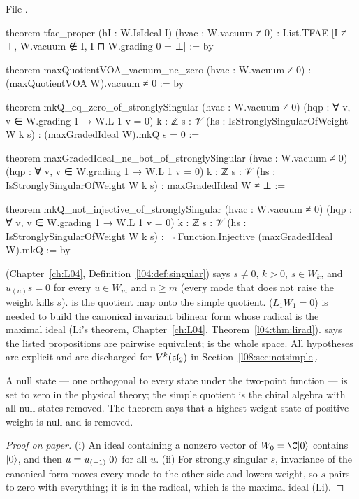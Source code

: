 \noindent File .
\begin{leancode}
theorem tfae_proper (hI : W.IsIdeal I) (hvac : W.vacuum ≠ 0) :
    List.TFAE [I ≠ ⊤, W.vacuum ∉ I, I ⊓ W.grading 0 = ⊥] := by

theorem maxQuotientVOA_vacuum_ne_zero (hvac : W.vacuum ≠ 0) :
    (maxQuotientVOA W).vacuum ≠ 0 := by

theorem mkQ_eq_zero_of_stronglySingular (hvac : W.vacuum ≠ 0)
    (hqp : ∀ v, v ∈ W.grading 1 → W.L 1 v = 0) {k : ℤ} {s : 𝒱}
    (hs : IsStronglySingularOfWeight W k s) : (maxGradedIdeal W).mkQ s = 0 :=

theorem maxGradedIdeal_ne_bot_of_stronglySingular (hvac : W.vacuum ≠ 0)
    (hqp : ∀ v, v ∈ W.grading 1 → W.L 1 v = 0) {k : ℤ} {s : 𝒱}
    (hs : IsStronglySingularOfWeight W k s) : maxGradedIdeal W ≠ ⊥ :=

theorem mkQ_not_injective_of_stronglySingular (hvac : W.vacuum ≠ 0)
    (hqp : ∀ v, v ∈ W.grading 1 → W.L 1 v = 0) {k : ℤ} {s : 𝒱}
    (hs : IsStronglySingularOfWeight W k s) :
    ¬ Function.Injective (maxGradedIdeal W).mkQ := by
\end{leancode}

\begin{dictionary}
 (Chapter~\ref{ch:L04}, Definition~\ref{l04:def:singular}) says
$s\ne0$, $k>0$, $s\in W_k$, and $u_{(n)}s = 0$ for every $u\in W_m$ and $n\ge m$ (every mode that does
not raise the weight kills $s$).  is the quotient map onto the simple
quotient.  ($L_1W_1 = 0$) is needed to build the canonical invariant bilinear form whose
radical is the maximal ideal (Li's theorem, Chapter~\ref{ch:L04}, Theorem~\ref{l04:thm:lirad}).  says the listed propositions are pairwise equivalent;  is the whole space. All hypotheses are explicit and are discharged for
$V^k(\mathfrak{sl}_2)$ in Section~\ref{l08:sec:notsimple}.
\end{dictionary}

\begin{physics}
A null state --- one orthogonal to every state under the two-point function --- is set to zero in the
physical theory; the simple quotient is the chiral algebra with all null states removed. The theorem
says that a highest-weight state of positive weight is null and is removed.
\end{physics}

\begin{proof}[Proof on paper]
(i) An ideal containing a nonzero vector of $W_0 = \C\leightvac$ contains $|0\rangle$, and then
$u = u_{(-1)}|0\rangle$ for all $u$. (ii) For strongly singular $s$, invariance of the canonical form
moves every mode to the other side and lowers weight, so $s$ pairs to zero with everything; it is in the
radical, which is the maximal ideal (Li).
\end{proof}

